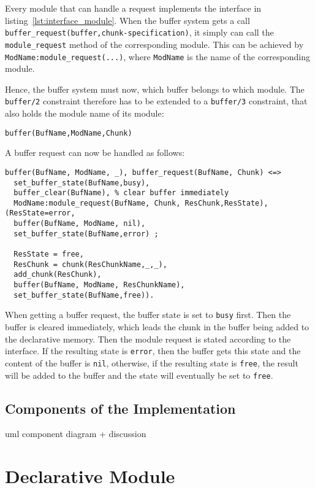 Every module that can handle a request implements the interface in listing~\ref{lst:interface_module}. When the buffer system gets a call \verb|buffer_request(buffer,chunk-specification)|, it simply can call the \verb|module_request| method of the corresponding module. This can be achieved by \verb|ModName:module_request(...)|, where \verb|ModName| is the name of the corresponding module.

Hence, the buffer system must now, which buffer belongs to which module. The \verb|buffer/2| constraint therefore has to be extended to a \verb|buffer/3| constraint, that also holds the module name of its module:

\begin{lstlisting}
buffer(BufName,ModName,Chunk)
\end{lstlisting}

A buffer request can now be handled as follows:

\begin{lstlisting}
buffer(BufName, ModName, _), buffer_request(BufName, Chunk) <=>
  set_buffer_state(BufName,busy),
  buffer_clear(BufName), % clear buffer immediately
  ModName:module_request(BufName, Chunk, ResChunk,ResState),
(ResState=error, 
  buffer(BufName, ModName, nil),
  set_buffer_state(BufName,error) ;
  
  ResState = free,
  ResChunk = chunk(ResChunkName,_,_),
  add_chunk(ResChunk), 
  buffer(BufName, ModName, ResChunkName),
  set_buffer_state(BufName,free)).
\end{lstlisting}

When getting a buffer request, the buffer state is set to \verb|busy| first. Then the buffer is cleared immediately, which leads the chunk in the buffer being added to the declarative memory. Then the module request is stated according to the interface. If the resulting state is \verb|error|, then the buffer gets this state and the content of the buffer is \verb|nil|, otherwise, if the resulting state is \verb|free|, the result will be added to the buffer and the state will eventually be set to \verb|free|. 

\subsection{Components of the Implementation}

uml component diagram + discussion



\section{Declarative Module}

